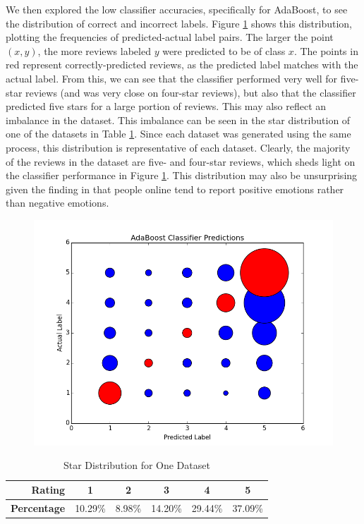 We then explored the low classifier accuracies, specifically for AdaBoost, to see the distribution of correct and incorrect labels. Figure \ref{distribution} shows this distribution, plotting the frequencies of predicted-actual label pairs. The larger the point $(x,y)$, the more reviews labeled $y$ were predicted to be of class $x$. The points in red represent correctly-predicted reviews, as the predicted label matches with the actual label. From this, we can see that the classifier performed very well for five-star reviews (and was very close on four-star reviews), but also that the classifier predicted five stars for a large portion of reviews. This may also reflect an imbalance in the dataset. This imbalance can be seen in the star distribution of one of the datasets in Table \ref{rawdistribution}. Since each dataset was generated using the same process, this distribution is representative of each dataset. Clearly, the majority of the reviews in the dataset are five- and four-star reviews, which sheds light on the classifier performance in Figure \ref{distribution}. This distribution may also be unsurprising given the finding in \cite{imbalance} that people online tend to report positive emotions rather than negative emotions.

\begin{figure}[!h]
\centering
\includegraphics[scale=0.5]{ab_predict}
\caption{}
\label{distribution}
\end{figure}

\begin{table}[!h]
\centering
\caption{Star Distribution for One Dataset}
\label{rawdistribution}
\begin{tabular}{|r|c|c|c|c|c|}
\hline
\bf Rating & 1 & 2 & 3 & 4 & 5\\
\hline
\bf Percentage & 10.29\% & 8.98\% & 14.20\% & 29.44\% & 37.09\%\\
\hline
\end{tabular}
\end{table}

